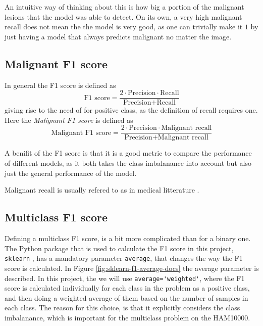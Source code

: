 An intuitive way of thinking about this is how big a portion of the malignant lesions
that the model was able to detect.
On its own, a very high malignant recall does not mean the the model is very good,
as one can trivially make it $1$ by just having a model that always predicts malignant no matter the image.

\subsection{Malignant F1 score}
In general the F1 score is defined as
\[
    \text{F1 score} = \frac{2 \cdot \text{Precision} \cdot \text{Recall}}{\text{Precision} + \text{Recall}}
\]
giving rise to the need of for positive class, as the definition of recall requires one.
Here the \textit{Malignant F1 score} is defined as
\[
    \text{Malignant F1 score} = \frac{2\cdot \text{Precision} \cdot \text{Malignant recall}}{\text{Precision} + \text{Malignant recall}}
\]

A benifit of the F1 score is that it is a good metric to compare the performance of different models,
as it both takes the class imbalanance into account but also just the general performance of the model.

Malignant recall is usually refered to as  in medical litterature
\cite{sensitivity-and-specificity}.

\subsection{Multiclass F1 score}
Defining a multiclass F1 score, is a bit more complicated than for a binary one.
The Python package that is used to calculate the F1 score in this project, \verb|sklearn|
\cite{sklearn}, has a mandatory parameter \verb|average|, that changes the way the F1 score is calculated.
In Figure \ref{fig:sklearn-f1-average-docs} the average parameter is described.
In this project, the we will use \verb|average='weighted'|, where the F1 score is calculated
individually for each class in the problem as a positive class,
and then doing a weighted average of them based
on the number of samples in each class.
The reason for this choice,
is that it explicitly considers the class imbalanance,
which is important for the multiclass problem on the HAM10000.


